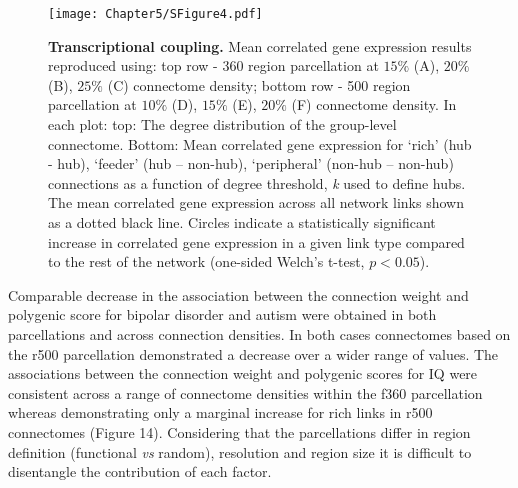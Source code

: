 \begin{figure}[h!]
\begin{center}
\texttt{[image: Chapter5/SFigure4.pdf]}%
\end{center}
\caption{\textbf{Transcriptional coupling.} 
Mean correlated gene expression results reproduced using: top row - 360 region parcellation at $15\%$ (A), $20\%$ (B), $25\%$ (C) connectome density; bottom row - 500 region parcellation at $10\%$ (D), $15\%$ (E), $20\%$ (F) connectome density. In each plot: top: The degree distribution of the group-level connectome. Bottom: Mean correlated gene expression for `rich' (hub - hub), `feeder' (hub – non-hub), `peripheral' (non-hub – non-hub) connections as a function of degree threshold, \textit{k} used to define hubs. The mean correlated gene expression across all network links shown as a dotted black line. Circles indicate a statistically significant increase in correlated gene expression in a given link type compared to the rest of the network (one-sided Welch's t-test, $p < 0.05$).}
\label{fig:Ch5SFig4}
\end{figure}

\newpage
Comparable decrease in the association between the connection weight and polygenic score for bipolar disorder and autism were obtained in both parcellations and across connection densities. In both cases connectomes based on the r500 parcellation demonstrated a decrease over a wider range of values. The associations between the connection weight and polygenic scores for IQ were consistent across a range of connectome densities within the f360 parcellation whereas demonstrating only a marginal increase for rich links in r500 connectomes (Figure 14). Considering that the parcellations differ in region definition (functional \textit{vs} random), resolution and region size it is difficult to disentangle the contribution of each factor. 


